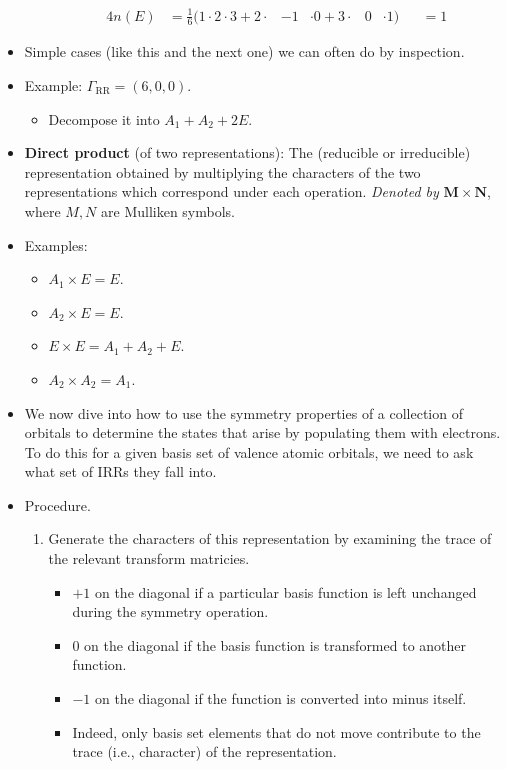 \documentclass[../notes.tex]{subfiles}
\begin{document}
\begin{itemize}
\begin{itemize}
\begin{alignat*}{4}
            n(E) &= \frac{1}{6}(1\cdot 2\cdot 3+2\cdot{}&-1&\cdot 0+3\cdot{}&0&\cdot 1) &&= 1
        \end{alignat*}
    \end{itemize}
    \item Simple cases (like this and the next one) we can often do by inspection.
    \item Example: $\Gamma_\text{RR}=(6,0,0)$.
    \begin{itemize}
        \item Decompose it into $A_1+A_2+2E$.
    \end{itemize}
    \item \textbf{Direct product} (of two representations): The (reducible or irreducible) representation obtained by multiplying the characters of the two representations which correspond under each operation. \emph{Denoted by} $\bm{M\times N}$, where $M,N$ are Mulliken symbols.
    \item Examples:
    \begin{itemize}
        \item $A_1\times E=E$.
        \item $A_2\times E=E$.
        \item $E\times E=A_1+A_2+E$.
        \item $A_2\times A_2=A_1$.
    \end{itemize}
    \item We now dive into how to use the symmetry properties of a collection of orbitals to determine the states that arise by populating them with electrons. To do this for a given basis set of valence atomic orbitals, we need to ask what set of IRRs they fall into.
    \item Procedure.
    \begin{enumerate}
        \item Generate the characters of this representation by examining the trace of the relevant transform matricies.
        \begin{itemize}
            \item $+1$ on the diagonal if a particular basis function is left unchanged during the symmetry operation.
            \item $0$ on the diagonal if the basis function is transformed to another function.
            \item $-1$ on the diagonal if the function is converted into minus itself.
            \item Indeed, only basis set elements that do not move contribute to the trace (i.e., character) of the representation.

\end{itemize}
\end{enumerate}
\end{itemize}
\end{document}
